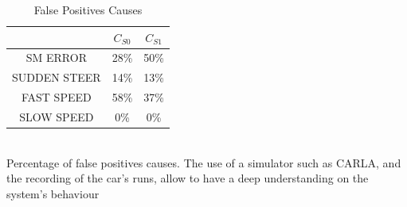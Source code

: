 \begin{table}
	\caption{False Positives Causes}
	\begin{center}
		\begin{tabular}{ |c|c|c| }
			\hline
			& $C_{S0}$ & $C_{S1}$ \\
			\hline
			SM ERROR & 28\% & 50\% \\
			\hline
			SUDDEN STEER & 14\% & 13\% \\
			\hline
			FAST SPEED & 58\% & 37\% \\
			\hline
			SLOW SPEED & 0\% & 0\% \\
			\hline
		\end{tabular}
		\\
		\vspace{0.3cm}
		Percentage of false positives causes. The use of a simulator such as CARLA, and the recording of the car's runs, allow to have a deep understanding on the system's behaviour
	\end{center}
\end{table}
